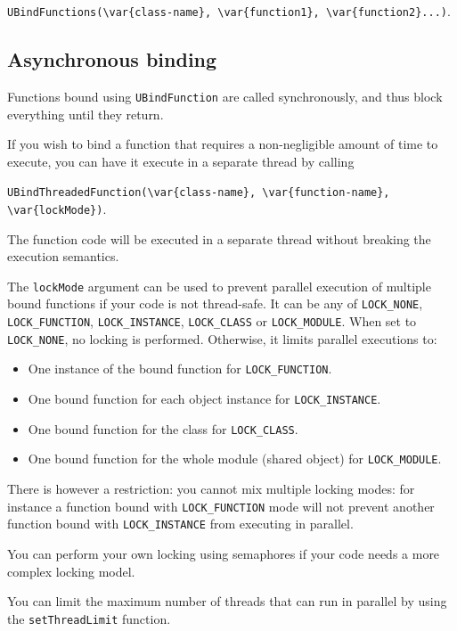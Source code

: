 \lstinline|UBindFunctions(\var{class-name}, \var{function1}, \var{function2}...)|.

\subsection{Asynchronous binding}
Functions bound using \lstinline{UBindFunction} are called synchronously, and
thus block everything until they return.

If you wish to bind a function that requires a non-negligible amount of time
to execute, you can have it execute in a separate thread by calling

\lstinline|UBindThreadedFunction(\var{class-name}, \var{function-name}, \var{lockMode})|.

The function code will be executed in a separate thread without breaking the
\us execution semantics.

The \lstinline{lockMode} argument can be used to prevent parallel execution
of multiple bound functions if your code is not thread-safe. It can be any of
\lstinline{LOCK_NONE}, \lstinline{LOCK_FUNCTION}, \lstinline{LOCK_INSTANCE},
\lstinline{LOCK_CLASS} or \lstinline{LOCK_MODULE}.
When set to \lstinline{LOCK_NONE}, no locking is performed. Otherwise, it
limits parallel executions to:

\begin{itemize}
\item One instance of the bound function for \lstinline{LOCK_FUNCTION}.
\item One bound function for each object instance for
\lstinline{LOCK_INSTANCE}.
\item One bound function for the class for \lstinline{LOCK_CLASS}.
\item One bound function for the whole module (shared object) for
\lstinline{LOCK_MODULE}.
\end{itemize}

There is however a restriction: you cannot mix multiple locking modes: for
instance a function bound with \lstinline{LOCK_FUNCTION} mode will not prevent
another function bound with \lstinline{LOCK_INSTANCE} from executing in
parallel.

You can perform your own locking using semaphores if your code needs a more
complex locking model.

You can limit the maximum number of threads that can run in parallel by using
the \lstinline{setThreadLimit} function.

